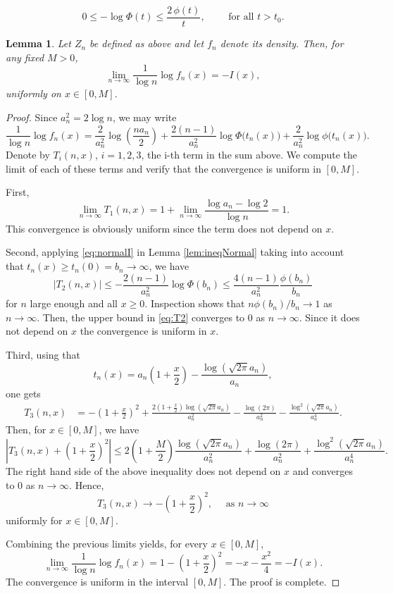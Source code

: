 \documentclass[10pt,a4paper]{amsart}
\newtheorem{lemma}{Lemma}
\begin{document}
\begin{equation}
0 \le -\log \Phi(t) \le \frac{2\,\phi(t)}{t},
\qquad \mbox{ for all }t>t_0.
\end{equation}

\begin{lemma}\label{lem:density}
Let $Z_n$ be defined as above and let $f_n$ denote its density.
Then, for any fixed $M>0$,  
\[
\lim_{n\to\infty}\frac{1}{\log n}\log f_n(x)
=
-I(x),
\]
 uniformly on $x\in[0,M]$.
\end{lemma}

\begin{proof}
Since $a_n^2=2\log n$, we may write
\[
\frac{1}{\log n}\log f_n(x)
=
\frac{2}{a_n^2}\log\!\left(\frac{n a_n}{2}\right)
+
\frac{2(n-1)}{a_n^2}\log\Phi\!\bigl(t_n(x)\bigr)
+
\frac{2}{a_n^2}\log\phi\!\bigl(t_n(x)\bigr).
\]
Denote by $T_i(n,x)$, $i=1,2,3$, the i-th term in the sum above. We compute the limit of each of these terms and verify that the convergence is  uniform in  $[0,M]$.

First,
\[
\lim_{n\to\infty}T_1(n,x)=
1+\lim_{n\to\infty}\frac{\log a_n-\log 2}{\log n}=1.
\]
This convergence is obviously uniform since the
term does not depend on $x$.

Second, applying \eqref{eq:normalI} in Lemma \ref{lem:ineqNormal} taking into account that $t_n(x)\ge t_n(0)=b_n\to \infty$, we have
\begin{equation}\label{eq:T2}
|T_2(n,x)|\le-\frac{2(n-1)}{a_n^2}\log\Phi(b_n)\le 
\frac{4(n-1)}{a_n^2}\frac{\phi(b_n)}{b_n}
\end{equation}
for $n$ large enough and all $x\ge 0$. 
Inspection shows that  $n\phi(b_n)/b_n\to 1$ as $n\to \infty$. Then, the upper bound in \eqref{eq:T2} converges to $0$ as $n\to\infty$. Since it does not depend on $x$ the convergence is  uniform in  $x$. 


Third, using that
\[
t_n(x)=a_n\left(1+\frac{x}{2}\right)-\frac{\log\left(\sqrt{2\pi}a_n\right)}{a_n},
\]
one gets
\begin{align*}
T_3(n,x)
&=
-\left(1+\frac{x}{2}\right)^2
+
\frac{2\left(1+\frac{x}{2}\right)\log(\sqrt{2\pi}a_n)}{a_n^2}  %
-\frac{\log(2\pi)}{a_n^2}
-
\frac{\log^2(\sqrt{2\pi}a_n)}{a_n^4}.
\end{align*}
Then, for $x\in[0,M]$, we have
\[
\left|T_3(n,x)+\left(1+\frac{x}{2}\right)^2\right|
\le 
2\left(1+\frac{M}{2}\right)\frac{\log(\sqrt{2\pi}a_n)}{a_n^2}+\frac{\log(2\pi)}{a_n^2}
+
\frac{\log^2(\sqrt{2\pi}a_n)}{a_n^4}.
\]
The right hand side of the above inequality does not depend on $x$ and converges to $0$ as $n\to\infty$. Hence,
\[
T_3(n,x)
\longrightarrow
-\left(1+\frac{x}{2}\right)^2,\quad\mbox{ as }
n\to\infty
\]
uniformly for $x\in[0,M]$.


Combining the previous limits yields, for every $x\in[0,M]$,
\[
\lim_{n\to\infty}\frac{1}{\log n}\log f_n(x)
=
1-\left(1+\frac{x}{2}\right)^2
=
-x-\frac{x^2}{4}=-I(x).
\]
The convergence is  uniform in  the interval $[0,M]$. The proof is complete.
\end{proof}
\end{document}
